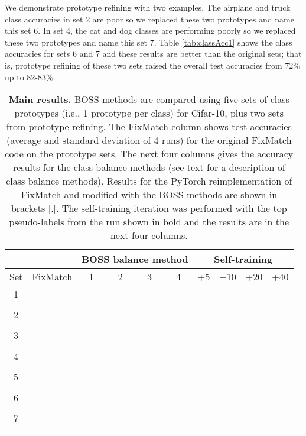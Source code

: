 \documentclass[final]{cvpr}
\begin{document}
We demonstrate prototype refining with two examples.  
The airplane and truck class accuracies in set 2 are poor so we replaced these two prototypes and name this set 6.
In set 4, the cat and dog classes are performing poorly so we replaced these two prototypes and name this set 7.
Table \ref{tab:classAcc1} shows the class accuracies for sets 6 and 7 and these results are better than the original sets; that is, prototype refining of these two sets raised the overall test accuracies from 72\% up to 82-83\%.






\begin{table*}
	\begin{center}
		\begin{tabular}{|c|c|c|c|c|c|c|c|c|c|}
			\hline
			&  & \multicolumn{4}{|c|}{BOSS balance method} & \multicolumn{4}{|c|}{Self-training}    \\
			\hline
			Set  & FixMatch & 1 & 2 & 3 & 4 & +5 & +10 & +20 & +40    \\
			
			\hline\hline
1 &   &   &   &  &  &  &  &  &    \\
			&   &   &   &   &  &  &  &  &    \\
			\hline
			2 &   &   &   &  &  &  &  &  &    \\
			&   &   &   &   &  &  &  &  &    \\
			\hline
			3 &   &   &   &  &  &  &  &  &    \\
			&   &   &   &   &  &  &  &  &    \\
			\hline
			4 &   &   &   &  &  &  &  &  &    \\
			&   &   &   &   &  &  &  &  &    \\
			\hline
			5 &   &   &   &  &  &  &  &  &    \\
			&   &   &   &   &  &  &  &  &    \\
			\hline
			6 &   &   &   &  &  &  &  &  &    \\
			&   &   &   &   &  &  &  &  &    \\
			\hline			
			7 &   &   &   &  &  &  &  &  &    \\
			&   &   &   &   &  &  &  &  &    \\
			\hline			
			
		\end{tabular}
	\end{center}
	\caption{ \textbf{Main results.}  BOSS methods are compared using five sets of class prototypes (i.e., 1 prototype per class) for Cifar-10, plus two sets from prototype refining.  The FixMatch column shows test accuracies (average and standard deviation of 4 runs) for the original FixMatch code on the prototype sets.  The next four columns gives the accuracy results for the class balance methods (see text for a description of class balance methods).  Results for the PyTorch reimplementation of FixMatch and modified with the BOSS methods are shown in brackets [.].  The self-training iteration was performed with the top pseudo-labels from the run shown in bold and the results are in the next four columns. 
}
	\label{tab:balanceAcc1}
\end{table*}
\end{document}

